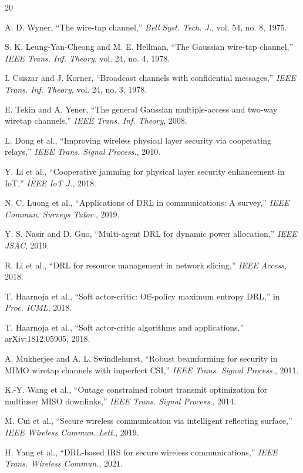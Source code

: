 \documentclass[conference]{IEEEtran}
\begin{document}
\begin{thebibliography}{20}

A. D. Wyner, ``The wire-tap channel,'' \emph{Bell Syst. Tech. J.}, vol. 54, no. 8, 1975.

S. K. Leung-Yan-Cheong and M. E. Hellman, ``The Gaussian wire-tap channel,'' \emph{IEEE Trans. Inf. Theory}, vol. 24, no. 4, 1978.

I. Csiszar and J. Korner, ``Broadcast channels with confidential messages,'' \emph{IEEE Trans. Inf. Theory}, vol. 24, no. 3, 1978.

E. Tekin and A. Yener, ``The general Gaussian multiple-access and two-way wiretap channels,'' \emph{IEEE Trans. Inf. Theory}, 2008.

L. Dong et al., ``Improving wireless physical layer security via cooperating relays,'' \emph{IEEE Trans. Signal Process.}, 2010.

Y. Li et al., ``Cooperative jamming for physical layer security enhancement in IoT,'' \emph{IEEE IoT J.}, 2018.

N. C. Luong et al., ``Applications of DRL in communications: A survey,'' \emph{IEEE Commun. Surveys Tutor.}, 2019.

Y. S. Nasir and D. Guo, ``Multi-agent DRL for dynamic power allocation,'' \emph{IEEE JSAC}, 2019.

R. Li et al., ``DRL for resource management in network slicing,'' \emph{IEEE Access}, 2018.

T. Haarnoja et al., ``Soft actor-critic: Off-policy maximum entropy DRL,'' in \emph{Proc. ICML}, 2018.

T. Haarnoja et al., ``Soft actor-critic algorithms and applications,'' arXiv:1812.05905, 2018.

A. Mukherjee and A. L. Swindlehurst, ``Robust beamforming for security in MIMO wiretap channels with imperfect CSI,'' \emph{IEEE Trans. Signal Process.}, 2011.

K.-Y. Wang et al., ``Outage constrained robust transmit optimization for multiuser MISO downlinks,'' \emph{IEEE Trans. Signal Process.}, 2014.

M. Cui et al., ``Secure wireless communication via intelligent reflecting surface,'' \emph{IEEE Wireless Commun. Lett.}, 2019.

H. Yang et al., ``DRL-based IRS for secure wireless communications,'' \emph{IEEE Trans. Wireless Commun.}, 2021.


\end{thebibliography}
\end{document}
